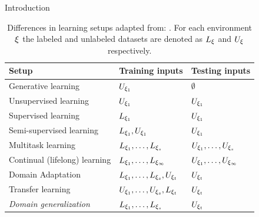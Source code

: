 \documentclass[10pt,usepdftitle=false,aspectratio=169]{beamer}
\begin{document}
\begin{frame}{Introduction}
    \begin{table}
    \centering
    \begin{tabular}{lll}
    \toprule
    \textbf{Setup} & \textbf{Training inputs}  & \textbf{Testing inputs} \\
    \midrule
        Generative learning & $U_{\xi_1}$ & $\emptyset$ \\ 
        Unsupervised learning & $U_{\xi_1}$ & $U_{\xi_1}$  \\ 
        Supervised learning & $L_{\xi_1}$ & $U_{\xi_1}$ \\ 
        Semi-supervised learning & $L_{\xi_1}, U_{\xi_1}$ & $U_{\xi_1}$ \\ 
        Multitask learning & $L_{\xi_1}, \ldots, L_{\xi_s}$ & $U_{\xi_1}, \ldots, U_{\xi_s}$ \\ 
        Continual (lifelong) learning & $L_{\xi_1}, \ldots, L_{\xi_\infty}$ & $U_{\xi_1}, \ldots, U_{\xi_\infty}$ \\ 
        Domain Adaptation & $L_{\xi_1}, \ldots, L_{\xi_s}, U_{\xi_t}$ & $U_{\xi_t}$ \\ 
        Transfer learning & $U_{\xi_1}, \ldots, U_{\xi_s}, L_{\xi_t}$ & $U_{\xi_t}$ \\ 
        \emph{Domain generalization} & $L_{\xi_1}, \ldots, L_{\xi_s}$ & $U_{\xi_t}$ \\ 
    \bottomrule
    \end{tabular}
    \caption[Differences in learning setups]{Differences in learning setups adapted from: \cite{gulrajani2020search}. For each environment $\xi$ the labeled and unlabeled datasets are denoted as $L_\xi$ and $U_\xi$ respectively.}
    \label{tab:learning_setups}
\end{table}
\end{frame}
\end{document}
